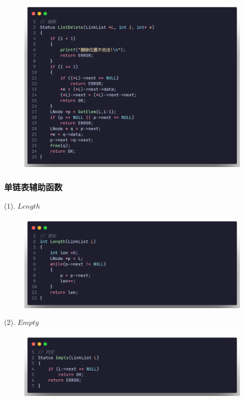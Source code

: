 \begin{figure}[H]
    \centering
    \includegraphics[scale=0.2]{"figure/Note/LinearList/SlDel.png"}
\end{figure}

\subsubsection{单链表辅助函数}

(1). $Length$

\begin{figure}[H]
    \centering
    \includegraphics[scale=0.2]{"figure/Note/LinearList/SlLen.png"}
\end{figure}

(2). $Empty$

\begin{figure}[H]
    \centering
    \includegraphics[scale=0.2]{"figure/Note/LinearList/SlEmpty.png"}
\end{figure}

